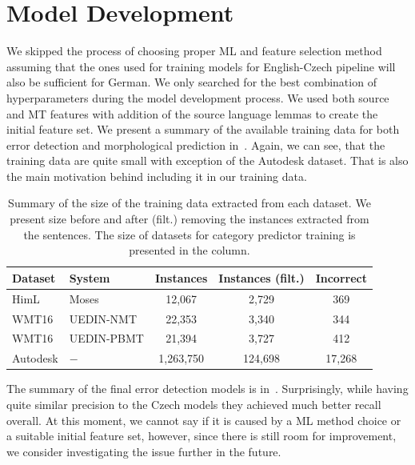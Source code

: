 \section{Model Development}

We skipped the process of choosing proper ML and feature selection method
assuming that the ones used for training models for English-Czech pipeline will
also be sufficient for German. We only searched for the best combination
of hyperparameters during the model development process. We used both source
and MT features with addition of the source language lemmas to create the initial feature set.
We present a summary
of the available training data for both error detection and morphological prediction in~.
Again, we can see, that the training data are quite small with exception of the Autodesk
dataset. That is also the main motivation behind including it in our training data.

\begin{table}[t]
\centering
\small

\begin{tabular}{ll|ccc}
Dataset  &  System &  \hash{} Instances  &  \hash{} Instances (filt.)  &  \hash{} Incorrect  \\
\hline
HimL  &  Moses  & 12,067  &  2,729  &  369  \\
WMT16  &  UEDIN-NMT  &  22,353  &  3,340  &  344  \\
WMT16  &  UEDIN-PBMT  &  21,394  &   3,727  &  412  \\
Autodesk  &  $-$  &  1,263,750  &  124,698  &  17,268  \\
\end{tabular}
\caption[Summary of the extracted German training data]{
    Summary of the size of the training data extracted from each dataset. We present
size before and after (filt.) removing the instances extracted from the  sentences.
The size of datasets for category predictor training is presented in the  column.
}
\label{wf-cat-data-sum}
\end{table}

The summary of the final error detection models is in~. Surprisingly,
while having quite similar precision to the Czech models they achieved much better
recall overall. At this moment, we cannot say if it is caused by a ML method choice or a suitable
initial feature set, however, since there is still room for improvement, we consider investigating
the issue further in the future.

